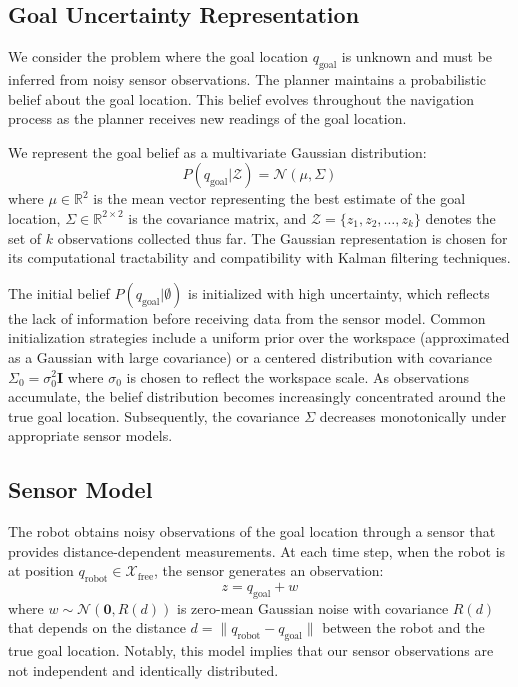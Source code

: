 \subsection{Goal Uncertainty Representation}

We consider the problem where the goal location $q_{\text{goal}}$ is unknown and must be inferred from noisy sensor observations. The planner maintains a probabilistic belief about the goal location. This belief evolves throughout the navigation process as the planner receives new readings of the goal location.

We represent the goal belief as a multivariate Gaussian distribution:
\begin{equation}
    P(q_{\text{goal}} | \mathcal{Z}) = \mathcal{N}(\mu, \Sigma)
\end{equation}
where $\mu \in \mathbb{R}^2$ is the mean vector representing the best estimate of the goal location, $\Sigma \in \mathbb{R}^{2 \times 2}$ is the covariance matrix, and $\mathcal{Z} = \{z_1, z_2, \ldots, z_k\}$ denotes the set of $k$ observations collected thus far. The Gaussian representation is chosen for its computational tractability and compatibility with Kalman filtering techniques.

The initial belief $P(q_{\text{goal}} | \emptyset)$ is initialized with high uncertainty, which reflects the lack of information before receiving data from the sensor model. Common initialization strategies include a uniform prior over the workspace (approximated as a Gaussian with large covariance) or a centered distribution with covariance $\Sigma_0 = \sigma_0^2 \mathbf{I}$ where $\sigma_0$ is chosen to reflect the workspace scale. As observations accumulate, the belief distribution becomes increasingly concentrated around the true goal location. Subsequently, the covariance $\Sigma$ decreases monotonically under appropriate sensor models.

\subsection{Sensor Model}

The robot obtains noisy observations of the goal location through a sensor that provides distance-dependent measurements. At each time step, when the robot is at position $q_{\text{robot}} \in \mathcal{X}_{\text{free}}$, the sensor generates an observation:
\begin{equation}
    z = q_{\text{goal}} + w
\end{equation}
where $w \sim \mathcal{N}(\mathbf{0}, R(d))$ is zero-mean Gaussian noise with covariance $R(d)$ that depends on the distance $d = \|q_{\text{robot}} - q_{\text{goal}}\|$ between the robot and the true goal location. Notably, this model implies that our sensor observations are not independent and identically distributed.

